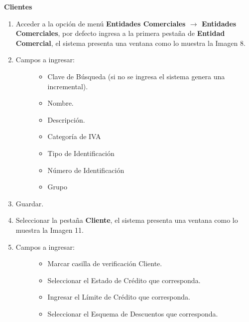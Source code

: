 \documentclass[letterpaper,10pt,spanish]{sphinxmanual}
\begin{document}
\textbf{Clientes}
\begin{enumerate}
\item {} 
Acceder a la opción de menú \textbf{Entidades Comerciales \(\rightarrow\) Entidades Comerciales}, por defecto ingresa a la primera pestaña de \textbf{Entidad Comercial}, el sistema presenta una ventana como lo muestra la Imagen 8.

\item {} \begin{description}
\item[{Campos a ingresar:}] \leavevmode\begin{itemize}
\item {} 
Clave de Búsqueda (si no se ingresa el sistema genera una incremental).

\item {} 
Nombre.

\item {} 
Descripción.

\item {} 
Categoría de IVA

\item {} 
Tipo de Identificación

\item {} 
Número de Identificación

\item {} 
Grupo

\end{itemize}

\end{description}

\item {} 
Guardar.

\item {} 
Seleccionar la pestaña \textbf{Cliente}, el sistema presenta una ventana como lo muestra la Imagen 11.

\item {} \begin{description}
\item[{Campos a ingresar:}] \leavevmode\begin{itemize}
\item {} 
Marcar casilla de verificación Cliente.

\item {} 
Seleccionar el Estado de Crédito que corresponda.

\item {} 
Ingresar el Límite de Crédito que corresponda.

\item {} 
Seleccionar el Esquema de Descuentos que corresponda.


\end{itemize}
\end{description}
\end{enumerate}
\end{document}
